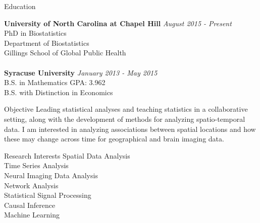 \documentclass{resume} %
\begin{document}

\begin{rSection}{Education}

{\bf University of North Carolina at Chapel Hill} \hfill {\em August 2015 - Present} 
\\ PhD in Biostatistics
\\ Department of Biostatistics
\\ Gillings School of Global Public Health\\
\\{\bf Syracuse University} \hfill {\em January 2013 - May 2015} 
\\ B.S. in Mathematics\hfill { GPA: 3.962}
\\ B.S. with Distinction in Economics

\end{rSection}


\begin{rSection}{Objective}
Leading statistical analyses and teaching statistics in a collaborative setting, along with the development of methods for analyzing spatio-temporal data.  I am interested in analyzing associations between spatial locations and how these may change across time for geographical and brain imaging data.
\end{rSection}


\begin{rSection}{Research Interests}
Spatial Data Analysis\\
Time Series Analysis\\
Neural Imaging Data Analysis\\
Network Analysis\\
Statistical Signal Processing\\
Causal Inference\\
Machine Learning
\end{rSection}
\end{document}
